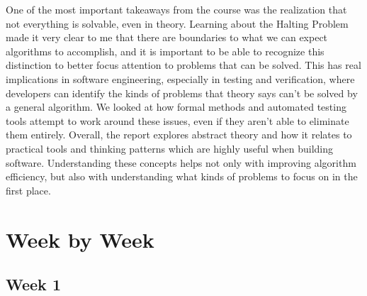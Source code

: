\documentclass{article}
\theoremstyle{theorem}
\theoremstyle{definition}
\theoremstyle{remark}
\begin{document}
One of the most important takeaways from the course was the realization that not everything is solvable, even in theory. Learning about the Halting Problem made it very clear to me that there are boundaries to what we can expect algorithms to accomplish, and it is important to be able to recognize this distinction to better focus attention to problems that can be solved. This has real implications in software engineering, especially in testing and verification, where developers can identify the kinds of problems that theory says can't be solved by a general algorithm. We looked at how formal methods and automated testing tools attempt to work around these issues, even if they aren’t able to eliminate them entirely. Overall, the report explores abstract theory and how it relates to practical tools and thinking patterns which are highly useful when building software. Understanding these concepts helps not only with improving algorithm efficiency, but also with understanding what kinds of problems to focus on in the first place. 


\section{Week by Week}\label{homework}

\subsection{Week 1}








\end{document}
